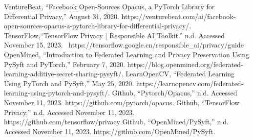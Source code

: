 \documentclass[conference]{IEEEtran}
\begin{document}
\begin{thebibliography}{00}
     VentureBeat, ``Facebook Open-Sources Opacus, a PyTorch Library 
    for Differential Privacy,'' August 31, 2020. \newline
    https://venturebeat.com/ai/facebook-open-sources-opacus-a-pytorch-library-for-differential-privacy/.
     TensorFlow,``TensorFlow Privacy | Responsible AI Toolkit.'' n.d. Accessed November 15, 2023. \
    \newline https://tensorflow.google.cn/responsible\_ai/privacy/guide
    \bibitem{b3} OpenMined, ``Introduction to Federated Learning and Privacy Preservation Using PySyft and PyTorch,'' February 7, 2020. \newline
    https://blog.openmined.org/federated-learning-additive-secret-sharing-pysyft/.
    \bibitem{b4} LearnOpenCV, ``Federated Learning Using PyTorch and PySyft,'' May 25, 2020. \newline
    https://learnopencv.com/federated-learning-using-pytorch-and-pysyft/.
    \bibitem{b5} Github, ``Pytorch/Opacus,'' n.d. Accessed November 11, 2023. \newline
    https://github.com/pytorch/opacus.
     Github, ``TensorFlow Privacy,'' n.d. Accessed November 11, 2023. \newline
    https://github.com/tensorflow/privacy
     Github, ``OpenMined/PySyft,'' n.d. Accessed November 11, 2023. \newline
    https://github.com/OpenMined/PySyft.
\end{thebibliography}
    
\end{document}
